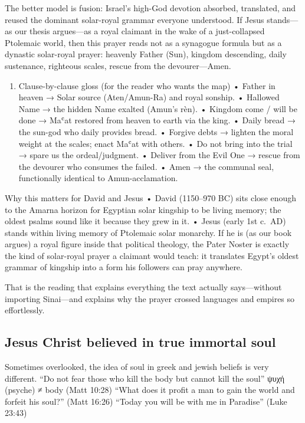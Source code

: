 The better model is fusion: Israel's high-God devotion absorbed, translated, and reused the dominant solar-royal grammar everyone understood.
If Jesus stands---as our thesis argues---as a royal claimant in the wake of a just-collapsed Ptolemaic world, then this prayer reads not as a synagogue formula but as a dynastic solar-royal prayer: heavenly Father (Sun), kingdom descending, daily sustenance, righteous scales, rescue from the devourer---Amen.

\begin{enumerate}
\def\labelenumi{\arabic{enumi})}
\setcounter{enumi}{5}
\item
  Clause-by-clause gloss (for the reader who wants the map) • Father in heaven → Solar source (Aten/Amun-Ra) and royal sonship.
• Hallowed Name → the hidden Name exalted (Amun's rèn).
• Kingdom come / will be done → Maʿat restored from heaven to earth via the king.
• Daily bread → the sun-god who daily provides bread.
• Forgive debts → lighten the moral weight at the scales; enact Maʿat with others.
• Do not bring into the trial → spare us the ordeal/judgment.
• Deliver from the Evil One → rescue from the devourer who consumes the failed.
• Amen → the communal seal, functionally identical to Amun-acclamation.
\end{enumerate}

Why this matters for David and Jesus • David (1150--970 BC) sits close enough to the Amarna horizon for Egyptian solar kingship to be living memory; the oldest psalms sound like it because they grew in it.
• Jesus (early 1st c.~AD) stands within living memory of Ptolemaic solar monarchy.
If he is (as our book argues) a royal figure inside that political theology, the Pater Noster is exactly the kind of solar-royal prayer a claimant would teach: it translates Egypt's oldest grammar of kingship into a form his followers can pray anywhere.

That is the reading that explains everything the text actually says---without importing Sinai---and explains why the prayer crossed languages and empires so effortlessly.

\subsection{Jesus Christ believed in true immortal soul}\label{subsec:jesus-christ-believed-in-true-immortal-soul}

Sometimes overlooked, the idea of soul in greek and jewish beliefs is very different.
``Do not fear those who kill the body but cannot kill the soul'' ψυχή (psyche) ≠ body (Matt 10:28) ``What does it profit a man to gain the world and forfeit his soul?'' (Matt 16:26) ``Today you will be with me in Paradise'' (Luke 23:43)

